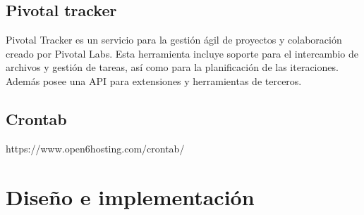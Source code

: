 \documentclass[a4paper, 12pt]{book}
\begin{document}
\section{Pivotal tracker}
\label{sec:pivotal}
Pivotal Tracker es un servicio para la gesti\'on \'agil de proyectos y colaboraci\'on creado por Pivotal Labs. Esta herramienta incluye soporte 
para el intercambio de archivos y gesti\'on de tareas, as\'i como para la planificaci\'on de las iteraciones. Adem\'as posee una API para extensiones y 
herramientas de terceros.


\section{Crontab}
\label{sec:crontab}
https://www.open6hosting.com/crontab/



\cleardoublepage
\chapter{Dise\~no e implementaci\'on}
\end{document}
